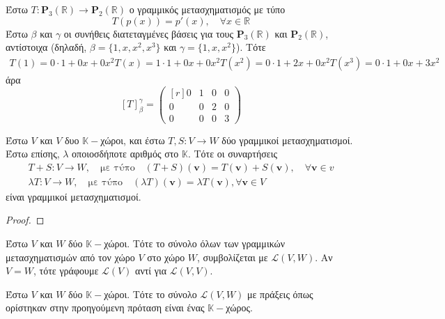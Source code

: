 \begin{example}
  Έστω $ T \colon \textbf{P}_{3}(\mathbb{R}) \to \textbf{P}_{2}(\mathbb{R}) $ ο 
  γραμμικός μετασχηματισμός με τύπο 
  \[
    T(p(x)) = p'(x), \quad \forall x \in \mathbb{R} 
  \]
  Έστω $ \beta $ και $\gamma$ οι συνήθεις διατεταγμένες βάσεις για τους $
  \textbf{P}_{3}(\mathbb{R}) $ και $ \textbf{P}_{2}(\mathbb{R}) $, αντίστοιχα 
  (δηλαδή, $ \beta = \{ 1,x,x^{2},x^{3} \}$ και $\gamma = \{ 1,x,x^{2} \}$). 
  Τότε
  \begin{align*}
    T(1) = 0\cdot 1 +0x +0x^{2}
    T(x) = 1 \cdot 1 + 0x + 0x^{2}
    T(x^{2}) = 0 \cdot 1 + 2x +0x^{2} 
    T(x^{3}) = 0 \cdot 1 + 0x + 3x^{2}
  \end{align*}
  άρα 
  \[
    [T]_{\beta}^{\gamma} = 
    \begin{pmatrix*}[r]
      0 & 1 & 0 & 0 \\
      0 & 0 & 2 & 0 \\
      0 & 0 & 0 & 3
    \end{pmatrix*}
  \] 
\end{example}

\begin{prop}
  Έστω $V$ και $V$ δυο $ \mathbb{K}- $χώροι, και έστω $ T,S \colon V \to W $ δύο 
  γραμμικοί μετασχηματισμοί. Έστω επίσης, $\lambda$ οποιοσδήποτε αριθμός στο 
  $ \mathbb{K} $. Τότε οι συναρτήσεις
  \begin{gather*}
    T+S \colon V \to W, \quad \text{με τύπο}\quad (T+S)(\mathbf{v}) = 
    T(\mathbf{v}) + S(\mathbf{v}), \quad \forall \mathbf{v} \in v \\
    \lambda T \colon V \to W, \quad \text{με τύπο}\quad (\lambda T)(\mathbf{v}) = 
    \lambda T(\mathbf{v}), \forall \mathbf{v} \in V
  \end{gather*}
  είναι γραμμικοί μετασχηματισμοί.
\end{prop}

\begin{proof}
\end{proof}

\begin{dfn}
  Έστω $V$ και $W$ δύο $ \mathbb{K}- $χώροι. Τότε το σύνολο όλων των γραμμικών
  μετασχηματισμών από τον χώρο $V$ στο χώρο $W$, συμβολίζεται με $ \mathcal{L}(V,W) $. 
  Αν $ V=W $, τότε γράφουμε $ \mathcal{L}(V) $ αντί για $ \mathcal{L}(V,V) $.
\end{dfn}

\begin{thm}
  Έστω $V$ και $W$ δύο $ \mathbb{K}- $χώροι. Τότε το σύνολο $ \mathcal{L}(V,W) $ 
  με πράξεις όπως ορίστηκαν στην προηγούμενη πρόταση είναι ένας $ \mathbb{K}- $χώρος.
\end{thm}

